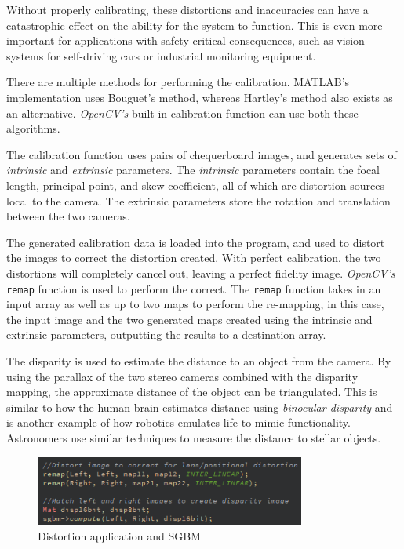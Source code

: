 \documentclass[conference]{IEEEtran}
\begin{document}
Without properly calibrating, these distortions and inaccuracies can have a catastrophic effect on the ability for the system to function. This is even more important for applications with safety-critical consequences, such as vision systems for self-driving cars\cite{Bosch} or industrial monitoring equipment\cite{Intel}.

There are multiple methods for performing the calibration. MATLAB's implementation uses Bouguet's method\cite{MATLAB_Calibration}\cite{Bouguet}, whereas Hartley's method\cite{hartley2003multiple} also exists as an alternative. \textit{OpenCV's} built-in calibration function can use both these algorithms\cite{Book_Calibration}.

The calibration function uses pairs of chequerboard images, and generates sets of \textit{intrinsic} and \textit{extrinsic} parameters. The \textit{intrinsic} parameters contain the focal length, principal point, and skew coefficient, all of which are distortion sources local to the camera. The extrinsic parameters store the rotation and translation between the two cameras. 

The generated calibration data is loaded into the program, and used to distort the images to correct the distortion created. With perfect calibration, the two distortions will completely cancel out, leaving a perfect fidelity image. \textit{OpenCV's} \verb|remap|\cite{remap} function is used to perform the correct. The \verb|remap| function takes in an input array as well as up to two maps to perform the re-mapping, in this case, the input image and the two generated maps created using the intrinsic and extrinsic parameters, outputting the results to a destination array\cite{remap_docs}.

The disparity is used to estimate the distance to an object from the camera. By using the parallax of the two stereo cameras combined with the disparity mapping, the approximate distance of the object can be triangulated. This is similar to how the human brain estimates distance using \textit{binocular disparity}\cite{10.3389/fpsyg.2014.00870}\cite{BERRYHILL2012525} and is another example of how robotics emulates life to mimic functionality. Astronomers use similar techniques to measure the distance to stellar objects\cite{parallax}.

\begin{figure}[H]
\centering
\includegraphics[width=3.5in]{t4_sgbm}
\caption{Distortion application and SGBM}
\label{fig:t4_sgbm}
\end{figure}
\end{document}
